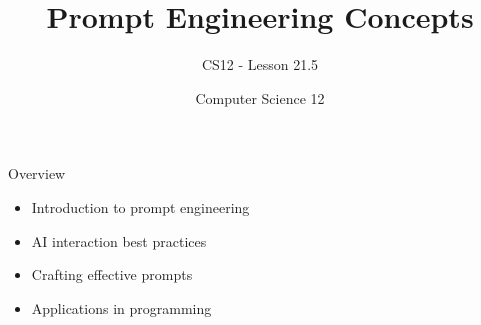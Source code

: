 \documentclass[10pt]{beamer}
\title{Prompt Engineering Concepts}
\subtitle{CS12 - Lesson 21.5}
\author{Computer Science 12}
\date{}
\begin{document}
\begin{frame}
    \titlepage
\end{frame}

\begin{frame}{Overview}
    \begin{itemize}
        \item Introduction to prompt engineering
        \item AI interaction best practices
        \item Crafting effective prompts
        \item Applications in programming
    \end{itemize}
\end{frame}

\end{document}
